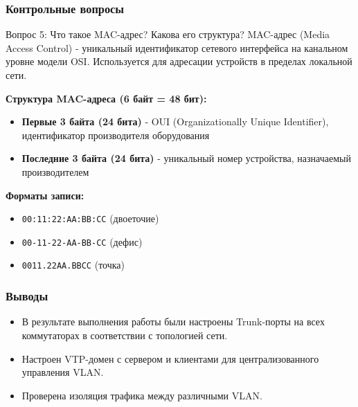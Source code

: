 \begin{frame}
\frametitle{Контрольные вопросы}

\begin{block}{Вопрос 5: Что такое MAC-адрес? Какова его структура?}
MAC-адрес (Media Access Control) - уникальный идентификатор сетевого интерфейса на канальном уровне модели OSI. Используется для адресации устройств в пределах локальной сети.

\textbf{Структура MAC-адреса (6 байт = 48 бит):}
\begin{itemize}
    \item \textbf{Первые 3 байта (24 бита)} - OUI (Organizationally Unique Identifier), идентификатор производителя оборудования
    \item \textbf{Последние 3 байта (24 бита)} - уникальный номер устройства, назначаемый производителем
\end{itemize}

\textbf{Форматы записи:}
\begin{itemize}
    \item \texttt{00:11:22:AA:BB:CC} (двоеточие)
    \item \texttt{00-11-22-AA-BB-CC} (дефис)
    \item \texttt{0011.22AA.BBCC} (точка)
\end{itemize}
\end{block}
\end{frame}

\begin{frame}
\frametitle{Выводы}
\begin{itemize}
    \item В результате выполнения работы были настроены Trunk-порты на всех коммутаторах в соответствии с топологией сети.
    \item Настроен VTP-домен с сервером и клиентами для централизованного управления VLAN.
    \item Проверена изоляция трафика между различными VLAN.
\end{itemize}
\end{frame}


